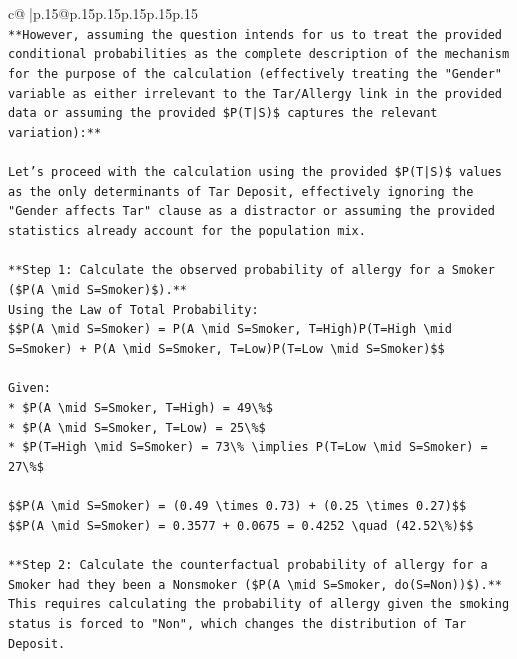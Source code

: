 \documentclass{article}
\begin{document}
{\begin{supertabular}{c@{$\;$}|p{.15\linewidth}@{}p{.15\linewidth}p{.15\linewidth}p{.15\linewidth}p{.15\linewidth}p{.15\linewidth}}
{{{\\ 
\texttt{**However, assuming the question intends for us to treat the provided conditional probabilities as the complete description of the mechanism for the purpose of the calculation (effectively treating the "Gender" variable as either irrelevant to the Tar/Allergy link in the provided data or assuming the provided \$P(T|S)\$ captures the relevant variation):**} \\
\\ 
\texttt{Let's proceed with the calculation using the provided \$P(T|S)\$ values as the only determinants of Tar Deposit, effectively ignoring the "Gender affects Tar" clause as a distractor or assuming the provided statistics already account for the population mix.} \\
\\ 
\texttt{**Step 1: Calculate the observed probability of allergy for a Smoker (\$P(A \textbackslash{}mid S=Smoker)\$).**} \\
\texttt{Using the Law of Total Probability:} \\
\texttt{\$\$P(A \textbackslash{}mid S=Smoker) = P(A \textbackslash{}mid S=Smoker, T=High)P(T=High \textbackslash{}mid S=Smoker) + P(A \textbackslash{}mid S=Smoker, T=Low)P(T=Low \textbackslash{}mid S=Smoker)\$\$} \\
\\ 
\texttt{Given:} \\
\texttt{*   \$P(A \textbackslash{}mid S=Smoker, T=High) = 49\textbackslash{}\%\$} \\
\texttt{*   \$P(A \textbackslash{}mid S=Smoker, T=Low) = 25\textbackslash{}\%\$} \\
\texttt{*   \$P(T=High \textbackslash{}mid S=Smoker) = 73\textbackslash{}\% \textbackslash{}implies P(T=Low \textbackslash{}mid S=Smoker) = 27\textbackslash{}\%\$} \\
\\ 
\texttt{\$\$P(A \textbackslash{}mid S=Smoker) = (0.49 \textbackslash{}times 0.73) + (0.25 \textbackslash{}times 0.27)\$\$} \\
\texttt{\$\$P(A \textbackslash{}mid S=Smoker) = 0.3577 + 0.0675 = 0.4252 \textbackslash{}quad (42.52\textbackslash{}\%)\$\$} \\
\\ 
\texttt{**Step 2: Calculate the counterfactual probability of allergy for a Smoker had they been a Nonsmoker (\$P(A \textbackslash{}mid S=Smoker, do(S=Non))\$).**} \\
\texttt{This requires calculating the probability of allergy given the smoking status is forced to "Non", which changes the distribution of Tar Deposit.} \\
}}}
\end{supertabular}}
\end{document}
